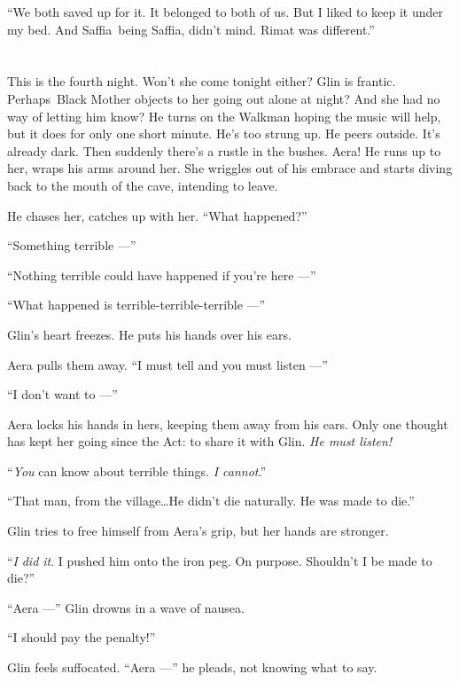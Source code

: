 \documentclass[twoside,11pt]{book}
\begin{document}
{}``We both saved up for it. It belonged to both of us. But I liked to keep it under my bed. And Saffia~being Saffia,
didn't mind. Rimat was different.''


\bigskip

\chapter{}

This is the fourth night. Won't she come tonight either? Glin is frantic. Perhaps~Black Mother objects to her going out
alone at night? And she had no way of letting him know? He turns on the Walkman hoping the music will help, but it does
for only one short minute. He's too strung up. He peers outside. It's already dark. Then suddenly there's a rustle in
the bushes. Aera! He runs up to her, wraps his arms around her. She wriggles out of his embrace and starts diving back
to the mouth of the cave, intending to leave.

 He chases her, catches up with her. ``What happened?''

``Something terrible ---''

``Nothing terrible could have happened if you're here ---''

``What happened is terrible-terrible-terrible ---''

Glin's heart freezes. He puts his hands over his ears.

Aera pulls them away. ``I must tell and you must listen ---''

``I don't want to ---''

Aera locks his hands in hers, keeping them away from his ears. Only one thought has kept her going since the
Act:  to share it with Glin. \textit{He must listen! }

``\textit{You} can know about terrible things. \textit{I cannot}.''

``That man, from the village{\ldots}He didn't die naturally. He was made to die.''

Glin tries to free himself from Aera's grip, but her hands are stronger.

``\textit{I} \textit{did it}. I pushed him onto the iron peg. On purpose. Shouldn't I be made to
die?''

``Aera ---'' Glin drowns in a wave of nausea.

``I should pay the penalty!''

Glin feels suffocated. ``Aera ---'' he pleads, not knowing what to say.
\end{document}
